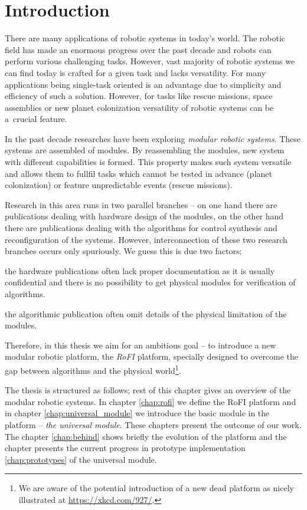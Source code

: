 \chapter{Introduction}\label{chap:introduction}

There are many applications of robotic systems in today's world. The robotic
field has made an enormous progress over the past decade and robots can perform
various challenging tasks. However, vast majority of robotic systems we can find
today is crafted for a given task and lacks versatility. For many applications
being single-task oriented is an advantage due to simplicity and efficiency of
such a solution. However, for tasks like rescue missions, space assemblies or
new planet colonization versatility of robotic systems can be a~crucial feature.

In the past decade researches have been exploring \emph{modular robotic
systems}. These systems are assembled of modules. By reassembling the modules,
new system with different capabilities is formed. This property makes such
system versatile and allows them to fullfil tasks which cannot be tested in
advance (planet colonization) or feature unpredictable events (rescue missions).

Research in this area runs in two parallel branches -- on one hand there are
publications dealing with hardware design of the modules, on the other hand
there are publications dealing with the algorithms for control synthesis and
reconfiguration of the systems. However, interconnection of these two research
branches occurs only spuriously. We guess this is due two factors;
\begin{enumerate*}
    \item the hardware publications often lack proper documentation as it is
    usually confidential and there is no possibility to get physical modules for
    verification of algorithms.
    \item the algorithmic publication often omit details of the physical
    limitation of the modules.
\end{enumerate*}

Therefore, in this thesis we aim for an ambitious goal -- to introduce a new
modular robotic platform, the \emph{RoFI} platform, specially designed to
overcome the gap between algorithms and the physical world\footnote{We are aware
of the potential introduction of a new dead platform as nicely illustrated at
\url{https://xkcd.com/927/}.}.

The thesis is structured as follows; rest of this chapter gives an overview of
the modular robotic systems. In chapter \ref{chap:rofi} we define the RoFI
platform and in chapter \ref{chap:universal_module} we introduce the basic
module in the platform -- \emph{the universal module}. These chapters present
the outcome of our work. The chapter \ref{chap:behind} shows briefly the
evolution of the platform and the chapter presents the current progress in
prototype implementation \ref{chap:prototypes} of the universal module.

